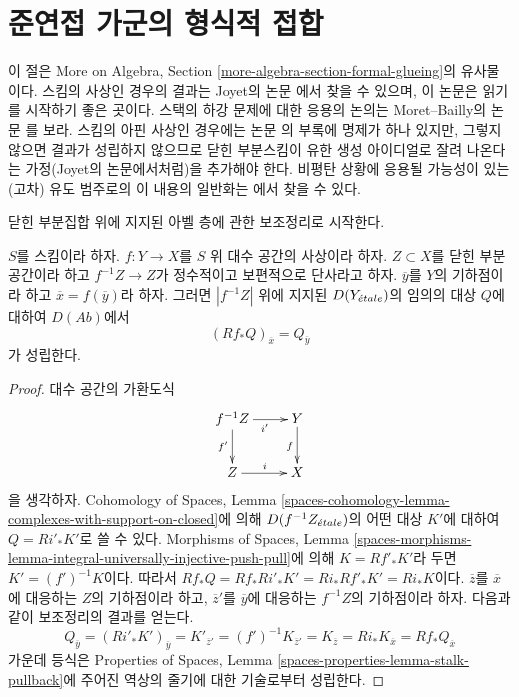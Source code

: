 \section{준연접 가군의 형식적 접합}
\label{section-formal-glueing}

\noindent
이 절은 More on Algebra, Section
\ref{more-algebra-section-formal-glueing}의 유사물이다.
스킴의 사상인 경우의 결과는 Joyet의 논문 \cite{Joyet}에서 찾을 수 있으며,
이 논문은 읽기를 시작하기 좋은 곳이다. 스택의 하강 문제에 대한 응용의
논의는 Moret--Bailly의 논문 \cite{MB}를 보라. 스킴의 아핀 사상인 경우에는
논문 \cite{Ferrand-Raynaud}의 부록에 명제가 하나 있지만, 그렇지 않으면
결과가 성립하지 않으므로 닫힌 부분스킴이 유한 생성 아이디얼로 잘려 나온다는
가정(Joyet의 논문에서처럼)을 추가해야 한다. 비평탄 상황에 응용될 가능성이
있는 (고차) 유도 범주로의 이 내용의 일반화는
\cite[Section 5]{Bhatt-Algebraize}에서 찾을 수 있다.

\medskip\noindent
닫힌 부분집합 위에 지지된 아벨 층에 관한 보조정리로 시작한다.

\begin{lemma}
\label{lemma-stalk-pushforward-with-support}
$S$를 스킴이라 하자. $f : Y \to X$를 $S$ 위 대수 공간의 사상이라 하자.
$Z \subset X$를 닫힌 부분공간이라 하고 $f^{-1}Z \to Z$가 정수적이고
보편적으로 단사라고 하자. $\overline{y}$를 $Y$의 기하점이라 하고
$\overline{x} = f(\overline{y})$라 하자. 그러면 $|f^{-1}Z|$ 위에 지지된
$D(Y_{\acute{e}tale})$의 임의의 대상 $Q$에 대하여 $D(\textit{Ab})$에서
$$
(Rf_*Q)_{\overline{x}} = Q_{\overline{y}}
$$
가 성립한다.
\end{lemma}

\begin{proof}
대수 공간의 가환도식
$$
\xymatrix{
f^{-1}Z \ar[r]_{i'} \ar[d]_{f'} & Y \ar[d]_f \\
Z \ar[r]^i & X
}
$$
을 생각하자. Cohomology of Spaces, Lemma
\ref{spaces-cohomology-lemma-complexes-with-support-on-closed}에 의해
$D(f^{-1}Z_{\acute{e}tale})$의 어떤 대상 $K'$에 대하여 $Q = Ri'_*K'$로 쓸 수 있다.
Morphisms of Spaces, Lemma
\ref{spaces-morphisms-lemma-integral-universally-injective-push-pull}에 의해
$K = Rf'_*K'$라 두면 $K' = (f')^{-1}K$이다. 따라서
$Rf_*Q = Rf_*Ri'_*K' = Ri_*Rf'_*K' = Ri_*K$이다.
$\overline{z}$를 $\overline{x}$에 대응하는 $Z$의 기하점이라 하고,
$\overline{z}'$를 $\overline{y}$에 대응하는 $f^{-1}Z$의 기하점이라 하자.
다음과 같이 보조정리의 결과를 얻는다.
$$
Q_{\overline{y}} = (Ri'_*K')_{\overline{y}} = K'_{\overline{z}'} =
(f')^{-1}K_{\overline{z}'} = K_{\overline{z}} = Ri_*K_{\overline{x}} =
Rf_*Q_{\overline{x}}
$$
가운데 등식은 Properties of Spaces, Lemma
\ref{spaces-properties-lemma-stalk-pullback}에 주어진 역상의 줄기에 대한
기술로부터 성립한다.
\end{proof}

